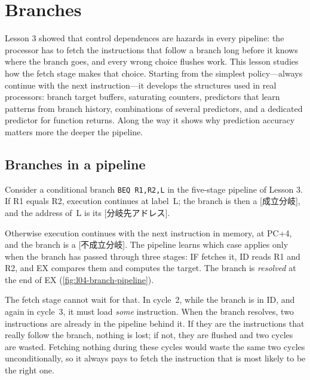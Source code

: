 \documentclass[../main.tex]{subfiles}
\begin{document}
\chapter{Branches}

Lesson 3 showed that control dependences are hazards in every pipeline: the
processor has to fetch the instructions that follow a branch long before it
knows where the branch goes, and every wrong choice flushes work.  This lesson
studies how the fetch stage makes that choice.  Starting from the simplest
policy---always continue with the next instruction---it develops the
structures used in real processors: branch target buffers, saturating
counters, predictors that learn patterns from branch history, combinations of
several predictors, and a dedicated predictor for function returns.  Along the
way it shows why prediction accuracy matters more the deeper the pipeline.

\section{Branches in a pipeline}
\label{sec:l04-branch-pipeline}

Consider a conditional branch \texttt{BEQ R1,R2,L} in the five-stage pipeline
of Lesson 3.  If R1 equals R2,
execution continues at label~L; the branch is then a [成立分岐], and the address of~L is its [分岐先アドレス].

Otherwise execution continues with the next instruction in memory, at PC+4,
and the branch is a [不成立分岐].  The pipeline learns
which case applies only when the branch has passed through three stages: IF
fetches it, ID reads R1 and R2, and EX compares them and computes the target.
The branch is \emph{resolved} at the end of EX (\cref{fig:l04-branch-pipeline}).

The fetch stage cannot wait for that.  In cycle~2, while the branch is in ID,
and again in cycle~3, it must load \emph{some} instruction.  When the branch
resolves, two instructions are already in the pipeline behind it.  If they
are the instructions that really follow the branch, nothing is lost; if not,
they are flushed and two cycles are wasted.  Fetching nothing during these
cycles would waste the same two cycles unconditionally, so it always pays to
fetch the instruction that is most likely to be the right one.
\end{document}
